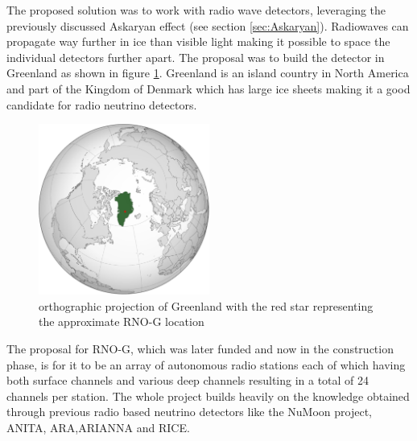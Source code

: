 The proposed solution was to work with radio wave detectors, leveraging the
previously discussed Askaryan effect (see section \ref{sec:Askaryan}).  Radiowaves can propagate
way further in ice than visible light making it possible to space the
individual detectors further apart. The proposal was to build the detector in Greenland as shown in figure \ref{fig:GreenlandOP}. Greenland is an
island country in North America and part of the Kingdom of Denmark which has
large ice sheets making it a good candidate for radio neutrino detectors.
\begin{figure}
  \centering
  \includegraphics[width=0.5\textwidth]{figures/GreenlandOP.pdf}
  \caption{orthographic projection of Greenland with the red star representing the approximate RNO-G location}
  \label{fig:GreenlandOP}
\end{figure}
The proposal for RNO-G, which was later funded and now in the construction
phase, is for it to be an array of autonomous radio stations each of which having both
surface channels and various deep channels resulting in a total of 24 channels
per station. The whole project builds heavily on the knowledge obtained through
previous radio based neutrino detectors like the NuMoon\cite{numoon} project,
ANITA\cite{ANITA}, ARA\cite{ARA},ARIANNA\cite{Barwick_2015} and RICE\cite{RICE}.

